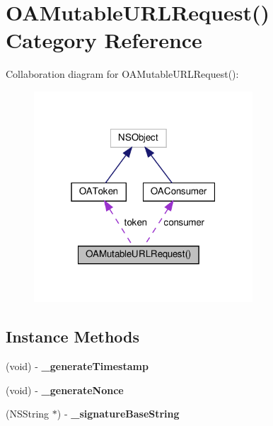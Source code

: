 \hypertarget{categoryOAMutableURLRequest_07_08}{}\section{O\+A\+Mutable\+U\+R\+L\+Request() Category Reference}
\label{categoryOAMutableURLRequest_07_08}


Collaboration diagram for O\+A\+Mutable\+U\+R\+L\+Request()\+:
\nopagebreak
\begin{figure}[H]
\begin{center}
\leavevmode
\includegraphics[width=232pt]{categoryOAMutableURLRequest_07_08__coll__graph}
\end{center}
\end{figure}
\subsection*{Instance Methods}
\begin{DoxyCompactItemize}
\item 
\mbox{\label{categoryOAMutableURLRequest_07_08_af50fa68a84f89719a7756e7fc530f661}} 
(void) -\/ {\bfseries \+\_\+generate\+Timestamp}
\item 
\mbox{\label{categoryOAMutableURLRequest_07_08_a298ee16d3840ae8318d7f3948230ff00}} 
(void) -\/ {\bfseries \+\_\+generate\+Nonce}
\item 
\mbox{\label{categoryOAMutableURLRequest_07_08_ac324b5e5ec4f7117bfba4f2de11358d7}} 
(N\+S\+String $\ast$) -\/ {\bfseries \+\_\+signature\+Base\+String}
\end{DoxyCompactItemize}
